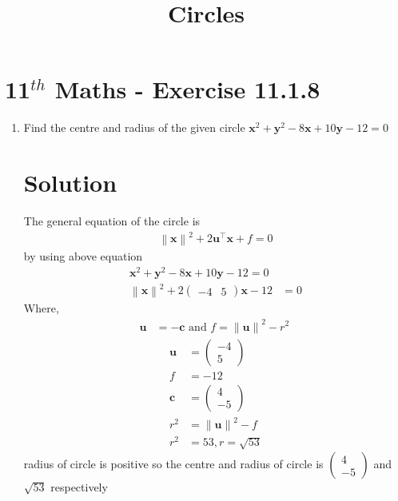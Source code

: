 \documentclass[12pt]{article}
\providecommand{\norm}[1]{\left\lVert#1\right\rVert}
\newcommand{\myvec}[1]{\ensuremath{\begin{pmatrix}#1\end{pmatrix}}}
\let\vec\mathbf
\begin{document}
\begin{center}
\title{\textbf{Circles}}
\date{\vspace{-5ex}} %
\maketitle
\end{center}
\setcounter{page}{1}
\section{11$^{th}$ Maths - Exercise 11.1.8}

\begin{enumerate}
\item Find the centre and radius of the given circle $\vec{x}^2+\vec{y}^2-8\vec{x}+10\vec{y}-12=0$
\section{Solution}
The general equation of  the circle is 
\begin{align}
	\norm{\vec{x}}^{2} + 2\vec{u}^{\top}\vec{x} + f = 0
\end{align}
by using above equation
\begin{align}
	\vec{x}^2+\vec{y}^2-8\vec{x}+10\vec{y}-12=0\\
	\norm{\vec{x}}^2+2\myvec{-4 & 5}\vec{x}-12&=0
\end{align}	
Where,
\begin{align}
	\vec{u} &= -\vec{c} \text{ and } f = \norm{\vec{u}}^{2} - r^{2}\
\end{align}
\begin{align}
 \vec{u}&=\myvec{-4\\5}\\
 f&=-12\\
\vec{c}&=\myvec{4 \\ -5}\\
r^2&=\norm{\vec{u}}^2-f\\
r^2&= 53,r=\sqrt{53}
\end{align}
radius of circle is positive so 
the centre and radius of circle is $\myvec{4 \\-5}$ and $\sqrt{53}$ respectively
\begin{figure}[!h]
	\begin{center} 

\end{center}
\end{figure}
\end{enumerate}
\end{document}
